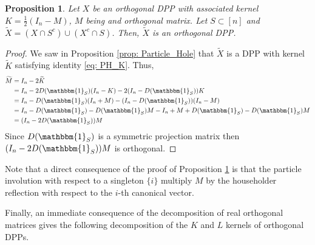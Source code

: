 \documentclass{article}
\numberwithin{equation}{section}
\renewcommand{\tilde}{\widetilde}
\newcommand{\cara}[1]{\mathbbm{1}_{#1}}
\theoremstyle{plain}
\newtheorem{proposition}{Proposition}[section]
\begin{document}
\begin{proposition}\label{prop: ortho_stable_particle_hole}
Let $X$ be an orthogonal DPP with associated kernel $K=\frac{1}{2}(I_n - M)$, $M$ being and orthogonal matrix. Let $S\subset [n]$ and $\tilde X= (X\cap S^c)\cup(X^c\cap S)$. Then, $\tilde X$ is an orthogonal DPP.
\end{proposition}
\begin{proof}
We saw in Proposition \ref{prop: Particle_Hole} that $\tilde X$ is a DPP with kernel $\tilde K$ satisfying identity \eqref{eq: PH_K}. Thus,
\begin{align*}
\tilde M &= I_n - 2\tilde K\\
&= I_n - 2D(\cara{S})(I_n-K) -2(I_n - D(\cara{S}))K\\
&= I_n - D(\cara{S})(I_n + M) -(I_n - D(\cara{S}))(I_n - M)\\
&= I_n - D(\cara{S}) -D(\cara{S})M -I_n + M + D(\cara{S}) - D(\cara{S})M\\
&= (I_n - 2D(\cara{S}))M
\end{align*}
Since $D(\cara{S})$ is a symmetric projection matrix then $(I_n-2D(\cara{S}))M$ is orthogonal.
\end{proof}

\noindent Note that a direct consequence of the proof of Proposition \ref{prop: ortho_stable_particle_hole} is that the particle involution with respect to a singleton $\{i\}$ multiply $M$ by the householder reflection with respect to the $i$-th canonical vector.

\medskip

\noindent Finally, an immediate consequence of the decomposition of real orthogonal matrices gives the following decomposition of the $K$ and $L$ kernels of orthogonal DPPs.
\end{document}
